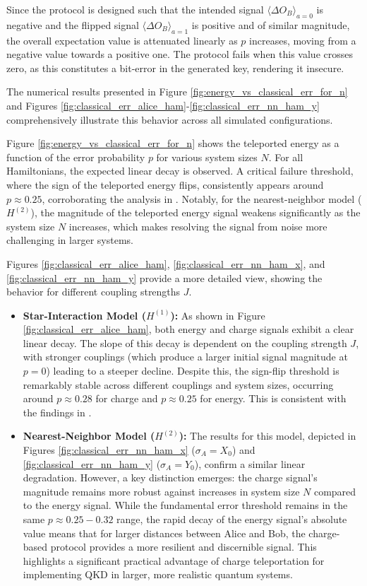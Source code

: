 

Since the protocol is designed such that the intended signal $\langle\Delta O_{B}\rangle_{a=0}$ is negative and the flipped signal $\langle\Delta O_{B}\rangle_{a=1}$ is positive and of similar magnitude, the overall expectation value is attenuated linearly as $p$ increases, moving from a negative value towards a positive one. The protocol fails when this value crosses zero, as this constitutes a bit-error in the generated key, rendering it insecure.

The numerical results presented in Figure \ref{fig:energy_vs_classical_err_for_n} and Figures \ref{fig:classical_err_alice_ham}-\ref{fig:classical_err_nn_ham_y} comprehensively illustrate this behavior across all simulated configurations.

Figure \ref{fig:energy_vs_classical_err_for_n} shows the teleported energy as a function of the error probability $p$ for various system sizes $N$. For all Hamiltonians, the expected linear decay is observed. A critical failure threshold, where the sign of the teleported energy flips, consistently appears around $p \approx 0.25$, corroborating the analysis in \cite{QKDbyQET}. Notably, for the nearest-neighbor model ($H^{(2)}$), the magnitude of the teleported energy signal weakens significantly as the system size $N$ increases, which makes resolving the signal from noise more challenging in larger systems.

Figures \ref{fig:classical_err_alice_ham}, \ref{fig:classical_err_nn_ham_x}, and \ref{fig:classical_err_nn_ham_y} provide a more detailed view, showing the behavior for different coupling strengths $J$.
\begin{itemize}
    \item \textbf{Star-Interaction Model ($H^{(1)}$):} As shown in Figure \ref{fig:classical_err_alice_ham}, both energy and charge signals exhibit a clear linear decay. The slope of this decay is dependent on the coupling strength $J$, with stronger couplings (which produce a larger initial signal magnitude at $p=0$) leading to a steeper decline. Despite this, the sign-flip threshold is remarkably stable across different couplings and system sizes, occurring around $p \approx 0.28$ for charge and $p \approx 0.25$ for energy. This is consistent with the findings in \cite{QKDbyQET}.

    \item \textbf{Nearest-Neighbor Model ($H^{(2)}$):} The results for this model, depicted in Figures \ref{fig:classical_err_nn_ham_x} ($\sigma_A = X_0$) and \ref{fig:classical_err_nn_ham_y} ($\sigma_A = Y_0$), confirm a similar linear degradation. However, a key distinction emerges: the charge signal's magnitude remains more robust against increases in system size $N$ compared to the energy signal. While the fundamental error threshold remains in the same $p \approx 0.25-0.32$ range, the rapid decay of the energy signal's absolute value means that for larger distances between Alice and Bob, the charge-based protocol provides a more resilient and discernible signal. This highlights a significant practical advantage of charge teleportation for implementing QKD in larger, more realistic quantum systems.
\end{itemize}

